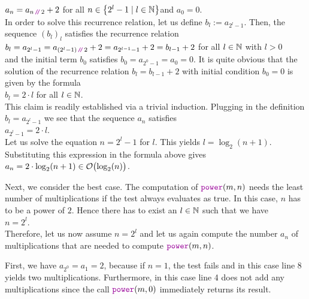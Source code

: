 \hspace*{1.3cm}
$a_n = a_{n \dvv 2} + 2$ \qquad for all $n \in \left\{2^l - 1 \mid l \in {\mathbb N}\right\}$\quad and $a_0 = 0$. 
\\[0.2cm]
In order to solve this recurrence relation, let us define $b_l := a_{2^l-1}$.  Then, the sequence
$(b_l)_l$ 
satisfies the recurrence relation
 \\[0.2cm]
\hspace*{1.3cm} 
$\ds b_l = a_{2^l-1} = a_{(2^l-1) \dvv 2} + 2 = a_{2^{l-1}-1} + 2 = b_{l-1} +2$ \qquad for all $l\in{\mathbb N}$ with
$l > 0$
\\[0.2cm]
and the initial term $b_0$ satisfies $b_0 = a_{2^0-1} = a_0 = 0$.  It is quite obvious that the
solution of the recurrence relation $b_l = b_{l-1} + 2$ with initial condition $b_0 = 0$ is given by the formula
\\[0.2cm]
\hspace*{1.3cm} $b_l = 2 \cdot l$ \qquad for all $l \in {\mathbb N}$. 
\\[0.2cm] 
This claim is readily established via a trivial induction.  Plugging in the definition $b_l = a_{2^l-1}$ we
see that the sequence $a_n$ satisfies \\[0.2cm]
\hspace*{1.3cm} $a_{2^l-1} = 2 \cdot l$. 
\\[0.2cm]
Let us solve the equation $n = 2^l - 1$ for $l$.  This yields
 $l =
\log_2(n+1)$.  Substituting this expression in the formula above gives \\[0.2cm]
\hspace*{1.3cm} $a_n = 2 \cdot \log_2(n+1) \in \mathcal{O}\bigl(\log_2(n)\bigr)$.
\vspace*{0.3cm}

Next, we consider the best case.  The computation of
$\mytt{power}(m,n)$ needs the least number of multiplications if the test 
always evaluates as true.  In this case, $n$ has to be a power of $2$.  
Hence there has to exist an $l\in {\mathbb N}$ such that we have
 \\[0.2cm]
\hspace*{1.3cm} $n = 2^l$.
 \\[0.2cm]
Therefore, let us now assume $n = 2^l$ and let us again compute the number $a_n$ of multiplications
that are needed to compute $\mytt{power}(m,n)$. 

First, we have $a_{2^0} = a_1 = 2$, because if $n = 1$, the test  fails and in
this case line 8 yields two multiplications.  Furthermore, in this case
line 4 does not add any multiplications since the call $\mytt{power}(m,0)$ immediately returns its
result.

